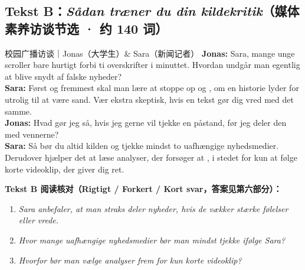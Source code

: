 \subsection*{Tekst B：\textit{Sådan træner du din kildekritik}（媒体素养访谈节选 · 约 140 词）}

\begin{emailbox}{校园广播访谈｜Jonas（大学生）\& Sara（新闻记者）}
\textbf{Jonas:} Sara, mange unge scroller bare hurtigt forbi ti overskrifter i minuttet. Hvordan undgår man egentlig at blive snydt af falske nyheder?\\
\textbf{Sara:} Først og fremmest skal man lære at stoppe op og , om en historie lyder for utrolig til at være sand. Vær ekstra skeptisk, hvis en tekst gør dig vred med det samme.\\
\textbf{Jonas:} Hvad gør jeg så, hvis jeg gerne vil tjekke en påstand, før jeg deler den med vennerne?\\
\textbf{Sara:} Så bør du altid  kilden og tjekke mindst to uafhængige nyhedsmedier. Derudover hjælper det at læse analyser, der forsøger at , i stedet for kun at følge korte videoklip, der giver dig ret.
\end{emailbox}

\textbf{Tekst B 阅读核对（Rigtigt / Forkert / Kort svar，答案见第六部分）：}
\begin{enumerate}
  \item \textit{Sara anbefaler, at man straks deler nyheder, hvis de vækker stærke følelser eller vrede.} \underline{\hspace{2.2cm}}
  \item \textit{Hvor mange uafhængige nyhedsmedier bør man mindst tjekke ifølge Sara?} \underline{\hspace{2.2cm}}
  \item \textit{Hvorfor bør man vælge analyser frem for kun korte videoklip?} \underline{\hspace{2.2cm}}
\end{enumerate}


